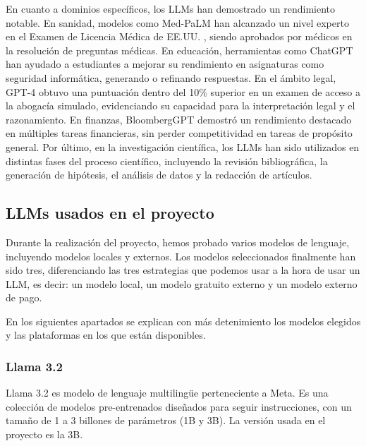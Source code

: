                 \noindent En cuanto a dominios específicos, los LLMs han demostrado un rendimiento notable. En sanidad, modelos como Med-PaLM \cite{zhao2025surveylargelanguagemodels} han alcanzado un nivel experto en el Examen de Licencia Médica de EE.UU. , siendo aprobados por médicos en la resolución de preguntas médicas. En educación, herramientas como ChatGPT han ayudado a estudiantes a mejorar su rendimiento en asignaturas como seguridad informática, generando o refinando respuestas. En el ámbito legal, GPT-4 obtuvo una puntuación dentro del 10\% superior en un examen de acceso a la abogacía simulado, evidenciando su capacidad para la interpretación legal y el razonamiento. En finanzas, BloombergGPT \cite{zhao2025surveylargelanguagemodels} \cite{wu2023bloomberggptlargelanguagemodel} demostró un rendimiento destacado en múltiples tareas financieras, sin perder competitividad en tareas de propósito general. Por último, en la investigación científica, los LLMs han sido utilizados en distintas fases del proceso científico, incluyendo la revisión bibliográfica, la generación de hipótesis, el análisis de datos y la redacción de artículos. 

            \subsection{LLMs usados en el proyecto}
            \label{sec:cap2_llms_usados}

                Durante la realización del proyecto, hemos probado varios modelos de lenguaje, incluyendo modelos locales y externos. Los modelos seleccionados finalmente han sido tres, diferenciando las tres estrategias que podemos usar a la hora de usar un LLM, es decir: un modelo local, un modelo gratuito externo y un modelo externo de pago.

                \noindent En los siguientes apartados se explican con más detenimiento los modelos elegidos y las plataformas en los que están disponibles.

                \subsubsection{Llama 3.2}

                    Llama 3.2 \cite{0037_llama32} es modelo de lenguaje multilingüe perteneciente a Meta. Es una colección de modelos pre-entrenados diseñados para seguir instrucciones, con un tamaño de 1 a 3 billones de parámetros (1B y 3B). La versión usada en el proyecto es la 3B.

